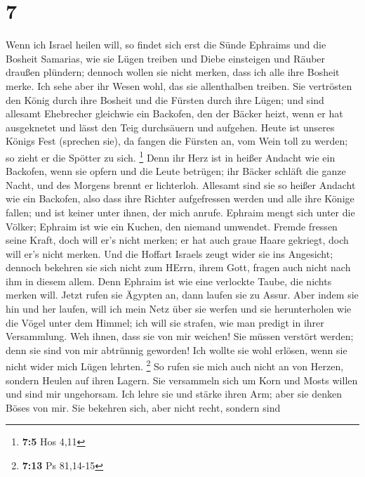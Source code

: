 \hypertarget{section-3}{%
\section{7}\label{section-3}}

 Wenn ich Israel heilen will, so findet sich erst die Sünde
Ephraims und die Bosheit Samarias, wie sie Lügen treiben und Diebe
einsteigen und Räuber draußen plündern;  dennoch wollen sie
nicht merken, dass ich alle ihre Bosheit merke. Ich sehe aber ihr Wesen
wohl, das sie allenthalben treiben.  Sie vertrösten den
König durch ihre Bosheit und die Fürsten durch ihre Lügen; 
und sind allesamt Ehebrecher gleichwie ein Backofen, den der Bäcker
heizt, wenn er hat ausgeknetet und lässt den Teig durchsäuern und
aufgehen.  Heute ist unseres Königs Fest (sprechen sie), da
fangen die Fürsten an, vom Wein toll zu werden; so zieht er die Spötter
zu sich. \footnote{\textbf{7:5} Hos 4,11}  Denn ihr Herz ist
in heißer Andacht wie ein Backofen, wenn sie opfern und die Leute
betrügen; ihr Bäcker schläft die ganze Nacht, und des Morgens brennt er
lichterloh.  Allesamt sind sie so heißer Andacht wie ein
Backofen, also dass ihre Richter aufgefressen werden und alle ihre
Könige fallen; und ist keiner unter ihnen, der mich anrufe. 
Ephraim mengt sich unter die Völker; Ephraim ist wie ein Kuchen, den
niemand umwendet.  Fremde fressen seine Kraft, doch will
er's nicht merken; er hat auch graue Haare gekriegt, doch will er's
nicht merken.  Und die Hoffart Israels zeugt wider sie ins
Angesicht; dennoch bekehren sie sich nicht zum HErrn, ihrem Gott, fragen
auch nicht nach ihm in diesem allem.  Denn Ephraim ist wie
eine verlockte Taube, die nichts merken will. Jetzt rufen sie Ägypten
an, dann laufen sie zu Assur.  Aber indem sie hin und her
laufen, will ich mein Netz über sie werfen und sie herunterholen wie die
Vögel unter dem Himmel; ich will sie strafen, wie man predigt in ihrer
Versammlung.  Weh ihnen, dass sie von mir weichen! Sie
müssen verstört werden; denn sie sind von mir abtrünnig geworden! Ich
wollte sie wohl erlösen, wenn sie nicht wider mich Lügen lehrten.
\footnote{\textbf{7:13} Ps 81,14-15}  So rufen sie mich
auch nicht an von Herzen, sondern Heulen auf ihren Lagern. Sie
versammeln sich um Korn und Mosts willen und sind mir ungehorsam.
 Ich lehre sie und stärke ihren Arm; aber sie denken Böses
von mir.  Sie bekehren sich, aber nicht recht, sondern sind
